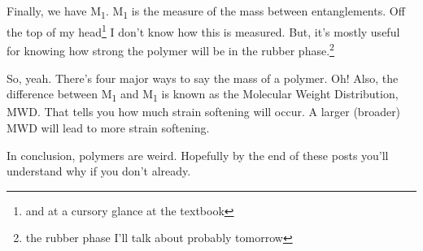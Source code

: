 \documentclass[12pt]{article}[titlepage]
\newcommand{\1}{\={a}}
\newcommand{\2}{\={e}}
\newcommand{\3}{\={\i}}
\newcommand{\4}{\=o}
\newcommand{\5}{\=u}
\newcommand{\6}{\={A}}
\newcommand{\sub}[1]{\textsubscript{1}}
\renewcommand{\,}{\textsuperscript{,}}
\begin{document}
Finally, we have M\sub{e}.
M\sub{e} is the measure of the mass between entanglements.
Off the top of my head\footnote{and at a cursory glance at the textbook} I don't know how this is measured.
But, it's mostly useful for knowing how strong the polymer will be in the rubber phase.\footnote{the rubber phase I'll talk about probably tomorrow}

So, yeah.
There's four major ways to say the mass of a polymer.
Oh! 
Also, the difference between M\sub{n} and M\sub{w} is known as the Molecular Weight Distribution, MWD.
That tells you how much strain softening will occur.
A larger (broader) MWD will lead to more strain softening.

In conclusion, polymers are weird.
Hopefully by the end of these posts you'll understand why if you don't already.
\end{document}
